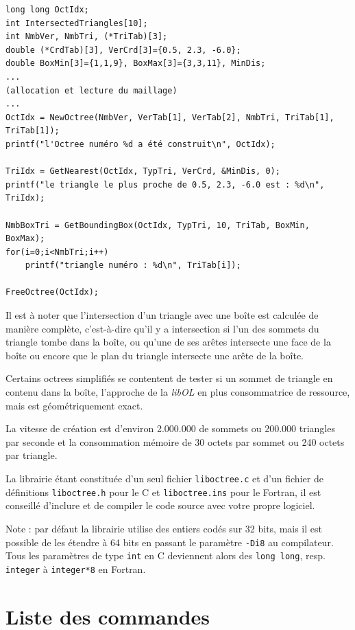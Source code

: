 \documentclass[a4paper,12pt]{article}
\begin{document}
\begin{tt}
\begin{verbatim}
long long OctIdx;
int IntersectedTriangles[10];
int NmbVer, NmbTri, (*TriTab)[3];
double (*CrdTab)[3], VerCrd[3]={0.5, 2.3, -6.0};
double BoxMin[3]={1,1,9}, BoxMax[3]={3,3,11}, MinDis;
...
(allocation et lecture du maillage)
...
OctIdx = NewOctree(NmbVer, VerTab[1], VerTab[2], NmbTri, TriTab[1], TriTab[1]);
printf("l'Octree numéro %d a été construit\n", OctIdx);

TriIdx = GetNearest(OctIdx, TypTri, VerCrd, &MinDis, 0);
printf("le triangle le plus proche de 0.5, 2.3, -6.0 est : %d\n", TriIdx);

NmbBoxTri = GetBoundingBox(OctIdx, TypTri, 10, TriTab, BoxMin, BoxMax);
for(i=0;i<NmbTri;i++)
    printf("triangle numéro : %d\n", TriTab[i]);

FreeOctree(OctIdx);
\end{verbatim}
\end{tt}
\normalfont

Il est à noter que l'intersection d'un triangle avec une boîte est calculée de manière complète, c'est-à-dire qu'il y a intersection si l'un des sommets du triangle tombe dans la boîte, ou  qu’une de ses arêtes intersecte une face de la boîte ou encore que le plan du triangle intersecte une arête de la boîte.

Certains octrees simplifiés se contentent de tester si un sommet de triangle en contenu dans la boîte, l'approche de la \emph{libOL} en plus consommatrice de ressource, mais est géométriquement exact.

La vitesse de création est d'environ 2.000.000 de sommets ou 200.000 triangles par seconde et la consommation mémoire de 30 octets par sommet ou 240 octets par triangle.

La librairie étant constituée d'un seul fichier {\tt liboctree.c} et d'un fichier de définitions {\tt liboctree.h} pour le C et {\tt liboctree.ins} pour le Fortran, il est conseillé d'inclure et de compiler le code source avec votre propre logiciel.

Note : par défaut la librairie utilise des entiers codés sur 32 bits, mais il est possible de les étendre à 64 bits en passant le paramètre {\tt -Di8} au compilateur. Tous les paramètres de type {\tt int} en C deviennent alors des {\tt long long}, resp. {\tt integer} à {\tt integer*8} en Fortran.


%
%

\section{Liste des commandes}
\end{document}
